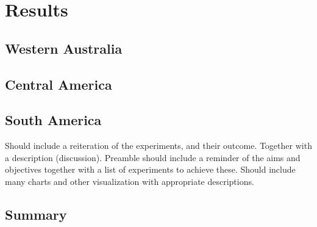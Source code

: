 \chapter{Results}

\section{Western Australia}

\section{Central America}

\section{South America}

Should include a reiteration of the experiments, and their outcome.  Together with a description (discussion).  Preamble should include a reminder of the aims and objectives together with a list of experiments to achieve these.  Should include many charts and other visualization with appropriate descriptions.  

\Blindtext

\section*{Summary}
\blindtext\enlargethispage{\baselineskip} %